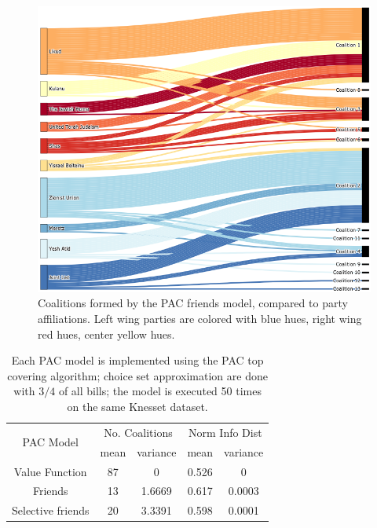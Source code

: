 \documentclass[letterpaper]{article} %
\begin{document}
\begin{figure}[htb]
\includegraphics[width=\columnwidth]{pac_friends}
\caption{Coalitions formed by the PAC friends model, compared to party affiliations. Left wing parties are colored with blue hues, right wing red hues, center yellow hues.}
\end{figure}

\begin{table}[h!]
\centering
\begin{tabular}{c|c|c|c|c}
\hline
\multirow{2}{*}{ PAC Model } & \multicolumn{2}{c|}{ No. Coalitions } & \multicolumn{2}{|c}{ Norm Info Dist } \\
& mean & variance & mean & variance \\
\hline
Value Function & 87 & 0 & 0.526 & 0 \\
Friends & 13 & 1.6669 & 0.617 & 0.0003 \\
Selective friends & 20 & 3.3391 & 0.598 & 0.0001 \\
\hline
\end{tabular}
\caption{Each PAC model is implemented using the PAC top covering algorithm; choice set approximation are done with $3/4$ of all bills; the model is executed 50 times on the same Knesset dataset.}
\label{table:pac_models}
\end{table}



\end{document}
